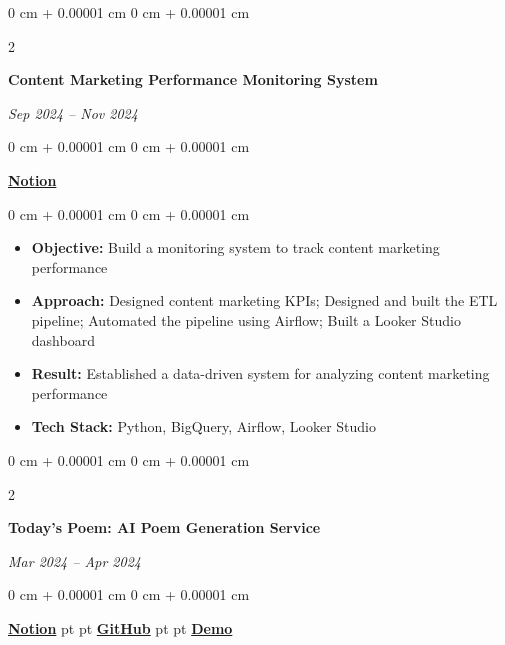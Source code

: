 \documentclass[10pt, letterpaper]{article}
\newenvironment{highlights}{
    \begin{itemize}[
        topsep=0.10 cm,
        parsep=0.10 cm,
        partopsep=0pt,
        itemsep=0pt,
        leftmargin=0 cm + 10pt
    ]
}{
    \end{itemize}
} %
\newenvironment{onecolentry}{
    \begin{adjustwidth}{
        0 cm + 0.00001 cm
    }{
        0 cm + 0.00001 cm
    }
}{
    \end{adjustwidth}
} %
\newenvironment{twocolentry}[2][]{
    \onecolentry
    \def\secondColumn{\textit{#2}}
    \setcolumnwidth{\fill, 4.5 cm}
    \begin{paracol}{2}
}{
    \switchcolumn \raggedleft \secondColumn
    \end{paracol}
    \endonecolentry
} %
\begin{document}
        \vspace{0.2 cm}
        \begin{twocolentry}{
            Sep 2024 -- Nov 2024
        }
            \textbf{Content Marketing Performance Monitoring System}
        \end{twocolentry}
        \begin{onecolentry}
            \href{https://awake-kumquat-803.notion.site/Content-Marketing-Performance-Monitoring-System-39f74ec8f70380f8b7b3c82cb89d9e76?source=copy_link}{\textbf{Notion}}
        \end{onecolentry}

        \vspace{0.10 cm}
        \begin{onecolentry}
            \begin{highlights}
                \item \textbf{Objective:} Build a monitoring system to track content marketing performance
                \item \textbf{Approach:} Designed content marketing KPIs; Designed and built the ETL pipeline; Automated the pipeline using Airflow; Built a Looker Studio dashboard
                \item \textbf{Result:} Established a data-driven system for analyzing content marketing performance
                \item \textbf{Tech Stack:} Python, BigQuery, Airflow, Looker Studio
            \end{highlights}
        \end{onecolentry}

        \vspace{0.2 cm}
        \begin{twocolentry}{
            Mar 2024 -- Apr 2024
        }
            \textbf{Today's Poem: AI Poem Generation Service}
        \end{twocolentry}
        \begin{onecolentry}
            \href{https://awake-kumquat-803.notion.site/Today-s-Poem-AI-Poem-Generation-Service-39f74ec8f703809781aefa258dd2b86f?source=copy_link}{\textbf{Notion}}
             pt
            \AND
             pt
            \href{https://github.com/boostcampaitech6/level2-3-nlp-finalproject-nlp-05}{\textbf{GitHub}}
             pt
            \AND
             pt
            \href{https://drive.google.com/file/d/1Posof2hvXHmEOwdVl48xTVUwrTU4mYpS/view?usp=drive_link}{\textbf{Demo}}
        \end{onecolentry}
\end{document}
